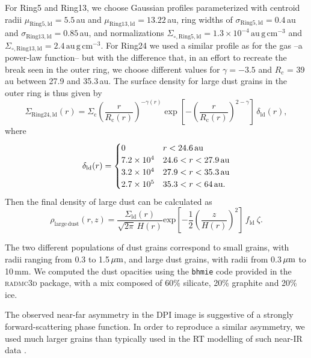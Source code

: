 \documentclass[usenatbib,times]{mnras}
\begin{document}
For Ring5 and Ring13, we choose Gaussian profiles parameterized with centroid radii $\mu_{\mathrm{Ring5, ld}}=5.5$\,au and $\mu_{\mathrm{Ring13, ld}}=13.22$\,au, ring widths of $\sigma_{\mathrm{Ring5,ld}}=0.4$\,au and $\sigma_{\mathrm{Ring13,ld}}=0.85$\,au, and normalizations $\Sigma_{\circ,\mathrm{Ring5,ld}}=1.3\times10^{-4}\,\mathrm{au\,g\,cm^{-3}}$ and $\Sigma_{\circ,\mathrm{Ring13,ld}}=2.4\,\mathrm{au\,g\,cm^{-3}}$. For Ring24 we used a similar profile as for the gas --a power-law function-- but with the difference that, in an effort to recreate the break seen in the outer ring, we choose different values for $\gamma = -3.5$ and $R_c$ = 39\,au between 27.9 and 35.3\,au. The surface density for large dust grains in the outer ring is thus given by
\begin{equation}
    \Sigma_{\mathrm{Ring24,ld}}(r) = \Sigma_{\mathrm{c}} \left(\frac{r}{R_{\mathrm{c}}(r)}\right)^{-\gamma(r)} \exp\left[-\left(\frac{r}{R_{\mathrm{c}}(r)}\right)^{2-\gamma}\right]\,\delta_{\mathrm{ld}}(r),
\end{equation}
where
\begin{equation}
  \delta_{\mathrm{ld}}(r) =
  \begin{cases}
  0                 & r < 24.6\text{\,au} \\
  7.2 \times10^{4} & 24.6 < r < 27.9\text{\,au} \\
  3.2 \times10^{4} & 27.9 < r < 35.3\text{\,au} \\
  2.7 \times10^{5} & 35.3 < r < 64\text{\,au.} \\
  \end{cases}
\end{equation}
Then the final density of large dust can be calculated as
\begin{equation}
\rho_{\mathrm{large\,dust}}(r,z)=
\frac{\Sigma_{\mathrm{ld}}(r)}{\sqrt{2\pi} \, H(r)} \mathrm{exp}\left[-\frac{1}{2} \left(\frac{z}{H(r)}\right)^2\right] \, f_{\mathrm{ld}} \: \zeta .
\end{equation}

The two different populations of dust grains correspond to small grains, with radii ranging from 0.3 to 1.5\,$\hbox{$\mu$m}$, and large dust grains, with radii from 0.3\,$\hbox{$\mu$m}$ to 10\,mm. We computed the dust opacities using the {\tt bhmie} code provided in the \textsc{radmc3d} package, with a mix composed of 60\% silicate, 20\% graphite and 20\% ice. 

The observed near-far asymmetry in the DPI image is suggestive of a strongly forward-scattering phase function. In order to reproduce a similar asymmetry, we used much larger grains than typically used in the RT modelling of such near-IR data \citep[e.g.,][]{2018MNRAS.477.5104C}. 
\end{document}
